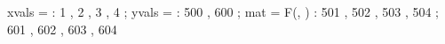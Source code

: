\begin{functable}
    xvals = \alpha : 1 , 2 , 3 , 4 ;
    yvals = \beta  : 500 , 600 ;
    mat = {F(\alpha, \beta )} : 501 , 502 , 503 , 504 ;
                                601 , 602 , 603 , 604 
\end{functable}
